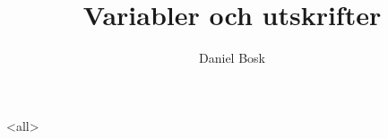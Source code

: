 \documentclass[ignoreframetext]{beamer}
\begin{document}
\title{%
  Variabler och utskrifter
}
\author{Daniel Bosk}

\begin{frame}
  \maketitle
\end{frame}

\mode<all>

\mode*
%

\end{document}
